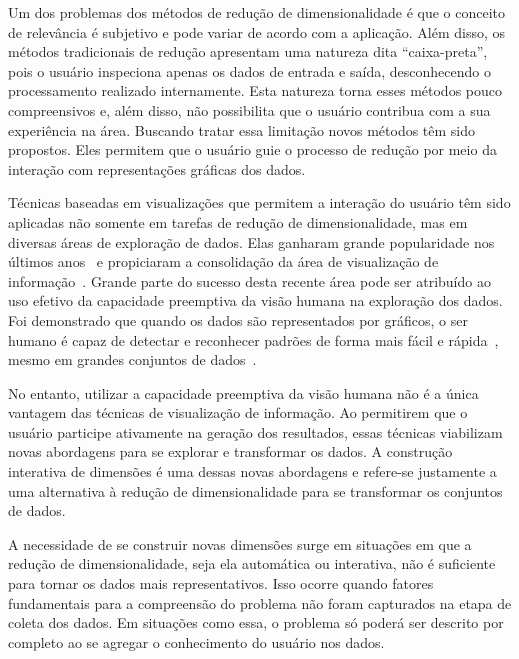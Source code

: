 Um dos problemas dos métodos de redução de dimensionalidade
é que o conceito de relevância é subjetivo e pode variar de
acordo com a aplicação. Além disso, os métodos tradicionais
de redução apresentam uma natureza dita ``caixa-preta'',
pois o usuário inspeciona apenas os dados de entrada e
saída, desconhecendo o processamento realizado internamente.
Esta natureza torna esses métodos pouco compreensivos e,
além disso, não possibilita que o usuário contribua com a sua
experiência na área. Buscando tratar essa limitação novos
métodos têm sido propostos. Eles permitem que o usuário
guie o processo de redução por meio da interação com
representações gráficas dos dados.

Técnicas baseadas em visualizações que permitem a
interação do usuário têm sido aplicadas não somente em
tarefas de redução de dimensionalidade, mas em diversas
áreas de exploração de dados. Elas ganharam grande
popularidade nos últimos anos~\cite{State2012} e propiciaram
a consolidação da área de visualização de
informação~\cite{Keim2002}. Grande parte do sucesso desta
recente área pode ser atribuído ao uso efetivo da capacidade
preemptiva da visão humana na exploração dos dados. Foi
demonstrado que quando os dados são representados por 
gráficos, o ser humano é capaz de detectar e reconhecer
padrões de forma mais fácil e rápida~\cite{Healey1995},
mesmo em grandes conjuntos de dados~\cite{Fodor2002}. 

No entanto, utilizar a capacidade preemptiva da visão humana
não é a única vantagem das técnicas de visualização de
informação. Ao permitirem que o usuário participe ativamente
na geração dos resultados, essas técnicas viabilizam novas
abordagens para se explorar e transformar os dados. A
construção interativa de dimensões é uma dessas novas
abordagens e refere-se justamente a uma alternativa à
redução de dimensionalidade para se transformar os conjuntos
de dados.

A necessidade de se construir novas dimensões surge em
situações em que a redução de dimensionalidade, seja ela
automática ou interativa, não é suficiente para tornar os
dados mais representativos. Isso ocorre quando fatores
fundamentais para a compreensão do problema não foram
capturados na etapa de coleta dos dados. Em situações como
essa, o problema só poderá ser descrito por completo ao se
agregar o conhecimento do usuário nos dados. 

